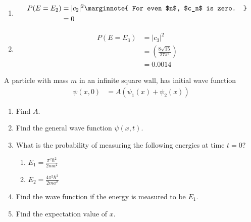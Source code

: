 \documentclass[titlepage, fleqn, a4paper, 12pt, twoside]{article}
\theoremstyle{definition}
\theoremstyle{theorem}
\begin{document}
\begin{solution}
\begin{enumerate}[leftmargin=*]
\begin{enumerate}[leftmargin=*]
				\item
					\begin{align*}
						P(E = E_2) &= |c_2|^2
						\marginnote
						{
							For even $n$, $c_n$ is zero.
						}\\
						&= 0
					\end{align*}
				\item
					\begin{align*}
						P(E = E_3) &= |c_3|^2\\
						&= \left( \frac{8 \sqrt{15}}{27 \pi^3} \right)\\
						&= 0.0014
					\end{align*}
			\end{enumerate}
	\end{enumerate}
\end{solution}

\begin{question}
	A particle with mass $m$ in an infinite square wall, has initial wave function
	\begin{align*}
		\psi(x,0) &= A \left( \psi_1(x) + \psi_2(x) \right)
	\end{align*}
	\begin{enumerate}
		\item
			Find $A$.
		\item
			Find the general wave function $\psi(x,t)$.
		\item
			What is the probability of measuring the following energies at time $t = 0$?
			\begin{enumerate}
				\item $E_1 = \frac{\pi^2 \hbar^2}{2 m a^2}$
				\item $E_2 = \frac{4 \pi^2 \hbar^2}{2 m a^2}$
			\end{enumerate}
		\item
			Find the wave function if the energy is measured to be $E_1$.
		\item
			Find the expectation value of $x$.
	\end{enumerate}
\end{question}
\end{document}
